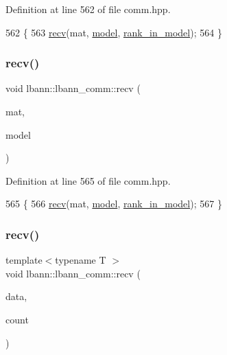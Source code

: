 Definition at line 562 of file comm.\+hpp.


\begin{DoxyCode}
562                                  \{
563     \hyperlink{classlbann_1_1lbann__comm_af8842cd4cea390f76d9146e1c4578de4}{recv}(mat, \hyperlink{namespacelbann_adee41f31f15f3906cbdcce4a1417eb56a20f35e630daf44dbfa4c3f68f5399d8c}{model}, \hyperlink{classlbann_1_1lbann__comm_a0dcccd57c2b591eb7682e192e0a09033}{rank\_in\_model});
564   \}
\end{DoxyCode}
\mbox{\label{classlbann_1_1lbann__comm_a018f0451e2a984d28b6a1f099cf9d421}} 
\subsubsection{\texorpdfstring{recv()}{recv()}\hspace{0.1cm}{\footnotesize\ttfamily [6/9]}}
{\footnotesize\ttfamily void lbann\+::lbann\+\_\+comm\+::recv (\begin{DoxyParamCaption}\item[{\hyperlink{base_8hpp_a0fab5387556805cfeac3e7e567bf66c5}{Dist\+Mat} \&}]{mat,  }\item[{int}]{model }\end{DoxyParamCaption})\hspace{0.3cm}{\ttfamily [inline]}}



Definition at line 565 of file comm.\+hpp.


\begin{DoxyCode}
565                                      \{
566     \hyperlink{classlbann_1_1lbann__comm_af8842cd4cea390f76d9146e1c4578de4}{recv}(mat, \hyperlink{namespacelbann_adee41f31f15f3906cbdcce4a1417eb56a20f35e630daf44dbfa4c3f68f5399d8c}{model}, \hyperlink{classlbann_1_1lbann__comm_a0dcccd57c2b591eb7682e192e0a09033}{rank\_in\_model});
567   \}
\end{DoxyCode}
\mbox{\label{classlbann_1_1lbann__comm_ab96fe808a236d41ecd05c0cc2461dba0}} 
\subsubsection{\texorpdfstring{recv()}{recv()}\hspace{0.1cm}{\footnotesize\ttfamily [7/9]}}
{\footnotesize\ttfamily template$<$typename T $>$ \\
void lbann\+::lbann\+\_\+comm\+::recv (\begin{DoxyParamCaption}\item[{T $\ast$}]{data,  }\item[{int}]{count }\end{DoxyParamCaption})\hspace{0.3cm}{\ttfamily [inline]}}

